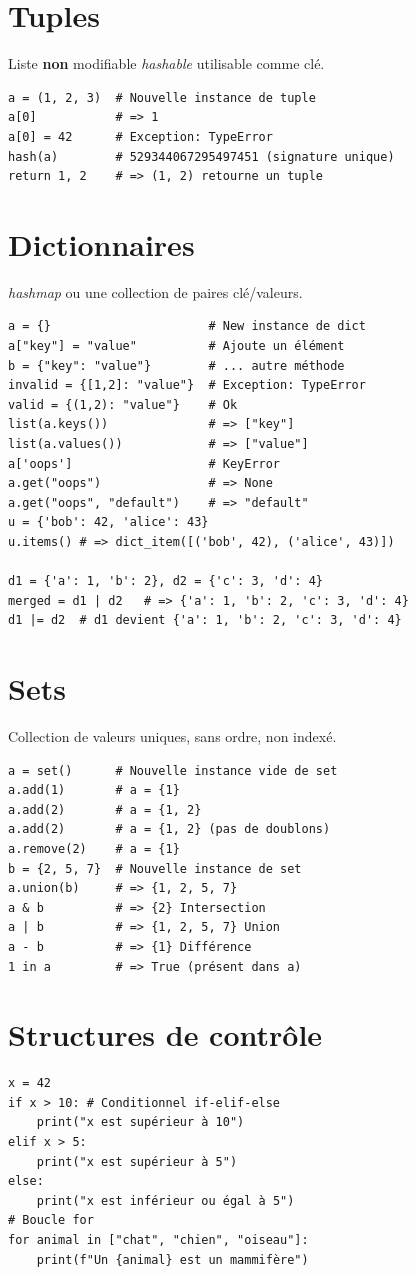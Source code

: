 \documentclass{article}
\begin{document}
\begin{multicols*}{4}
\section*{Tuples}
Liste \textbf{non} modifiable \emph{hashable} utilisable comme clé.
\begin{lstlisting}
a = (1, 2, 3)  # Nouvelle instance de tuple
a[0]           # => 1
a[0] = 42      # Exception: TypeError
hash(a)        # 529344067295497451 (signature unique)
return 1, 2    # => (1, 2) retourne un tuple
\end{lstlisting}

\section*{Dictionnaires}
\emph{hashmap} ou une collection de paires clé/valeurs.
\begin{lstlisting}
a = {}                      # New instance de dict
a["key"] = "value"          # Ajoute un élément
b = {"key": "value"}        # ... autre méthode
invalid = {[1,2]: "value"}  # Exception: TypeError
valid = {(1,2): "value"}    # Ok
list(a.keys())              # => ["key"]
list(a.values())            # => ["value"]
a['oops']                   # KeyError
a.get("oops")               # => None
a.get("oops", "default")    # => "default"
u = {'bob': 42, 'alice': 43}
u.items() # => dict_item([('bob', 42), ('alice', 43)])

d1 = {'a': 1, 'b': 2}, d2 = {'c': 3, 'd': 4}
merged = d1 | d2   # => {'a': 1, 'b': 2, 'c': 3, 'd': 4}
d1 |= d2  # d1 devient {'a': 1, 'b': 2, 'c': 3, 'd': 4}
\end{lstlisting}

\section*{Sets}
Collection de valeurs uniques, sans ordre, non indexé.
\begin{lstlisting}
a = set()      # Nouvelle instance vide de set
a.add(1)       # a = {1}
a.add(2)       # a = {1, 2}
a.add(2)       # a = {1, 2} (pas de doublons)
a.remove(2)    # a = {1}
b = {2, 5, 7}  # Nouvelle instance de set
a.union(b)     # => {1, 2, 5, 7}
a & b          # => {2} Intersection
a | b          # => {1, 2, 5, 7} Union
a - b          # => {1} Différence
1 in a         # => True (présent dans a)
\end{lstlisting}

\section*{Structures de contrôle}
\begin{lstlisting}
x = 42
if x > 10: # Conditionnel if-elif-else
    print("x est supérieur à 10")
elif x > 5:
    print("x est supérieur à 5")
else:
    print("x est inférieur ou égal à 5")
# Boucle for
for animal in ["chat", "chien", "oiseau"]:
    print(f"Un {animal} est un mammifère")


\end{lstlisting}
\end{multicols*}
\end{document}
